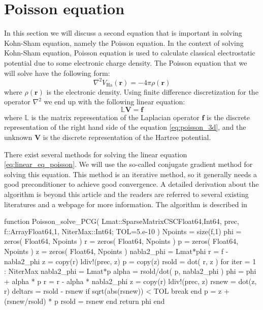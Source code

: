 \section{Poisson equation}

In this section we will discuss a second equation that is important
in solving Kohn-Sham equation, namely the Poisson equation. In the
context of solving Kohn-Sham equation, Poisson equation is used to
calculate classical electrostatic potential due to some electronic
charge density.
The Poisson equation that we will solve have the following form:
\begin{equation}
\nabla^2 V_{\mathrm{Ha}}(\mathbf{r}) = -4\pi\rho(\mathbf{r})
\label{eq:poisson_3d}
\end{equation}
where $\rho(\mathbf{r})$ is the electronic density. Using finite
difference discretization for the operator $\nabla^2$ we end up with
the following linear equation:
\begin{equation}
\mathbb{L} \mathbf{V} = \mathbf{f}
\label{eq:linear_eq_poisson}
\end{equation}
where $\mathbb{L}$ is the matrix representation of the Laplacian operator
$\mathbf{f}$ is the discrete representation of the right hand side of the equation
\ref{eq:poisson_3d}, and the unknown $\mathbf{V}$ is the discrete representation of
the Hartree potential.

There exist several methods for solving the linear equation \ref{eq:linear_eq_poisson}.
We will use the so-called conjugate gradient method for solving this equation.
This method is an iterative method, so it generally needs a good preconditioner to
achieve good convergence. A detailed derivation about the algorithm is beyond this
article and the readers are referred to several existing literatures \cite{Hestenes1952,Shewchuk1994}
and a webpage \cite{wiki-Conjugate-gradient} for more
information. The algorithm is described in 

\begin{juliacode}
function Poisson_solve_PCG( Lmat::SparseMatrixCSC{Float64,Int64},
                            prec,
                            f::Array{Float64,1}, NiterMax::Int64;
                            TOL=5.e-10 )
    Npoints = size(f,1)
    phi = zeros( Float64, Npoints )
    r = zeros( Float64, Npoints )
    p = zeros( Float64, Npoints )
    z = zeros( Float64, Npoints )
    nabla2_phi = Lmat*phi
    r = f - nabla2_phi
    z = copy(r)
    ldiv!(prec, z)
    p = copy(z)
    rsold = dot( r, z )
    for iter = 1 : NiterMax
        nabla2_phi = Lmat*p
        alpha = rsold/dot( p, nabla2_phi )
        phi = phi + alpha * p
        r = r - alpha * nabla2_phi
        z = copy(r)
        ldiv!(prec, z)
        rsnew = dot(z, r)
        deltars = rsold - rsnew
        if sqrt(abs(rsnew)) < TOL
            break
        end
        p = z + (rsnew/rsold) * p
        rsold = rsnew
    end
    return phi
end
\end{juliacode}

